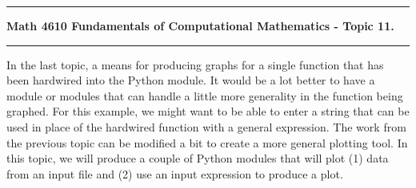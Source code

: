 \documentclass[10pt,fleqn]{article}
\begin{document}
\vskip0.1in\hrule\vskip0.1in \noindent
{\bf Math 4610 Fundamentals of Computational Mathematics  - Topic 11.}
\vskip0.1in\hrule\vskip0.1in \noindent
In the last topic, a means for producing graphs for a single function that has
been hardwired into the Python module. It would be a lot better to have a module
or modules that can handle a little more generality in the function being
graphed. For this example, we might want to be able to enter a string that can
be used in place of the hardwired function with a general expression. The work
from the previous topic can be modified a bit to create a more general plotting
tool. In this topic, we will produce a couple of Python modules that will plot
(1) data from an input file and (2) use an input expression to produce a plot.
\end{document}
